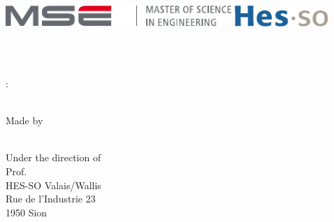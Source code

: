 

\begin{center}
\includegraphics[height=8mm]{Include/Figure/logo/mse-full-cropped.pdf}
\hfill
\includegraphics[height=8mm]{Include/Figure/logo/HES-SO_logo_Pantone.pdf}
\end{center}

\vfill

\begin{flushleft}
	\small \addr
\end{flushleft}

\vfill

\begin{center}
	\huge \bigTitre \\
	\Large \subBigTitre \\
\end{center}

\vfill

\begin{center}
	\Large \nameLabo:\\
	\huge \titre \\
\end{center}

\vfill

\vfill

\begin{flushright}
	\Large Made by\\
	\huge \nomAuteur\\
	
	\vfill
	
	\Large Under the direction of \\
	\normalsize Prof. \professeur\\
	HES-SO Valais/Wallis \\
	Rue de l'Industrie 23 \\
	1950 Sion \\
\end{flushright}
\vfill

\begin{flushright}
\end{flushright}

